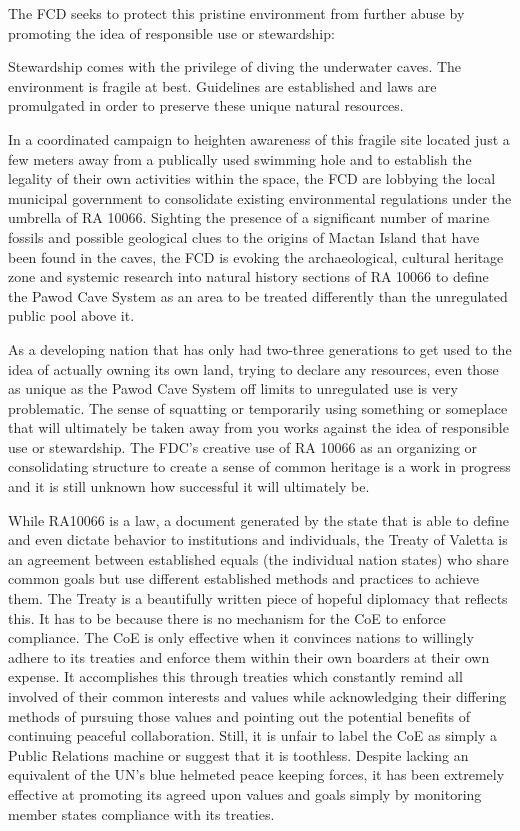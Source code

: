 The FCD seeks to protect this pristine environment from further abuse by promoting the idea of responsible use or stewardship:
\begin{displayquote}
	Stewardship comes with the privilege of diving the underwater caves. The environment is fragile at best. Guidelines are established and laws are promulgated in order to preserve these unique natural resources. %
	\end{displayquote}
	

In a coordinated campaign to heighten awareness of this fragile site located just a few meters away from a publically used swimming hole and to establish the legality of their own activities within the space, the FCD are lobbying the local municipal government to consolidate existing environmental regulations under the umbrella of RA 10066. Sighting the presence of a significant number of marine fossils and possible geological clues to the origins of Mactan Island that have been found in the caves, the FCD is evoking the archaeological, cultural heritage zone and systemic research into natural history sections of RA 10066 to define the Pawod Cave System as an area to be treated differently than the unregulated public pool above it. %

As a developing nation that has only had two-three generations to get used to the idea of actually owning its own land, trying to declare any resources, even those as unique as the Pawod Cave System off limits to unregulated use is very problematic. The sense of squatting or temporarily using something or someplace that will ultimately be taken away from you works against the idea of responsible use or stewardship. The FDC’s creative use of RA 10066 as an organizing or consolidating structure to create a sense of common heritage is a work in progress and it is still unknown how successful it will ultimately be.

While RA10066 is a law, a document generated by the state that is able to define and even dictate behavior to institutions and individuals, the Treaty of Valetta is an agreement between established equals (the individual nation states) who share common goals but use different established methods and practices to achieve them. The Treaty is a beautifully written piece of hopeful diplomacy that reflects this. It has to be because there is no mechanism for the CoE to enforce compliance. The CoE is only effective when it convinces nations to willingly adhere to its treaties and enforce them within their own boarders at their own expense. It accomplishes this through treaties which constantly remind all involved of their common interests and values while acknowledging their differing methods of pursuing those values and pointing out the potential benefits of continuing peaceful collaboration. Still, it is unfair to label the CoE as simply a Public Relations machine or suggest that it is toothless. Despite lacking an equivalent of the UN’s blue helmeted peace keeping forces, it has been extremely effective at promoting its agreed upon values and goals simply by monitoring member states compliance with its treaties.   

